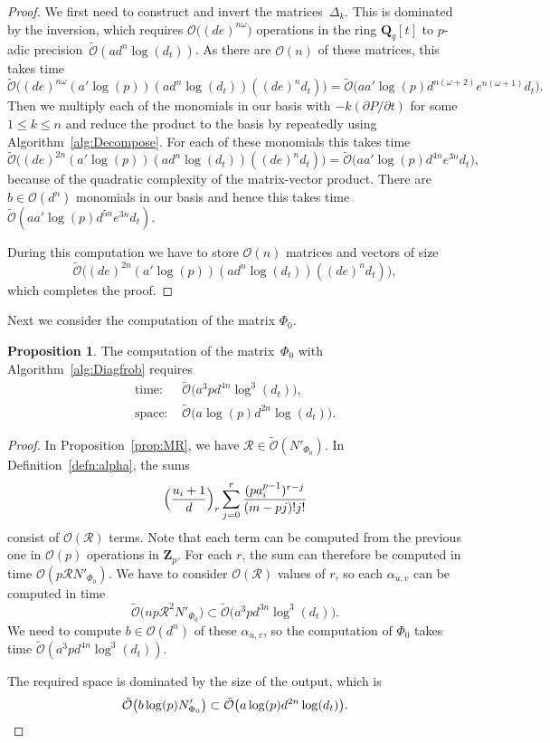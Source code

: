 \documentclass[a4paper,11pt]{article}
\numberwithin{equation}{section}
\newcommand{\ZZ}{\mathbf{Z}} %
\newcommand{\QQ}{\mathbf{Q}} %
\providecommand{\BigOh}{\mathcal{O}}          %
\providecommand{\SoftOh}{\tilde{\mathcal{O}}} %
\theoremstyle{definition}
\newtheorem{prop}[thm]{Proposition}
\begin{document}
\begin{proof}
We first need to construct and invert the matrices~$\Delta_k$.  This is 
dominated by the inversion, which requires $\BigOh\bigl((de)^{n \omega}\bigr)$ 
operations in the ring $\QQ_q[t]$ to $p$-adic 
precision~$\SoftOh(a d^n \log(d_t))$. As there are $\BigOh(n)$ of 
these matrices, this takes time 
\[
\SoftOh\bigl((de)^{n \omega} (a' \log(p)) (a d^n \log(d_t)) ((de)^n d_t)\bigr) = 
    \SoftOh\bigl(a a' \log(p) d^{n(\omega+2)} e^{n(\omega+1)} d_t\bigr).
\]
Then we multiply each of the monomials in our basis with 
$-k (\partial P / \partial t)$ for some $1 \leq k \leq n$ and 
reduce the product to the basis by repeatedly using 
Algorithm~\ref{alg:Decompose}.  For each of these monomials this 
takes time 
\[
\SoftOh\bigl((de)^{2n} (a' \log(p)) (a d^n \log(d_t)) ((de)^n d_t)\bigr) = 
    \SoftOh\bigl(a a' \log(p) d^{4n}e^{3n} d_t\bigr),
\]
because of the quadratic complexity of the matrix-vector product.  
There are $b \in \BigOh(d^n)$ monomials in our basis and hence this 
takes time $\SoftOh(a a' \log(p) d^{5n}e^{3n} d_t)$.

During this computation we have to store $\BigOh(n)$ matrices 
and vectors of size 
\[
\SoftOh\bigl((de)^{2n} (a' \log(p)) (a d^n \log(d_t)) ((de)^n d_t)\bigr),
\] 
which completes the proof.
\end{proof}

Next we consider the computation of the matrix $\Phi_0$.

\begin{prop} \label{prop:complexityPhi0}
The computation of the matrix~$\Phi_0$ with Algorithm~\ref{alg:Diagfrob} requires
\begin{align*}
\mbox{time: }  & \SoftOh\bigl(a^3 p d^{4n} \log^3(d_t)\bigr), \\
\mbox{space: } & \SoftOh\bigl(a \log(p) d^{2n} \log(d_t)\bigr).
\end{align*}
\end{prop}

\begin{proof}
In Proposition~\ref{prop:MR}, we have $\mathcal{R} \in \SoftOh(N'_{\Phi_0})$.
In Definition~\ref{defn:alpha}, the sums
\begin{equation*} \label{eqn:ifactor}
\Bigl(\frac{u_i+1}{d} \Bigr)_r \sum_{j=0}^{r} \frac{(p a_i^{p-1})^{r-j}}{(m-pj)!j!}
\end{equation*}
consist of $\BigOh(\mathcal{R})$ terms. Note that each term can be computed from the previous one in $\BigOh(p)$ operations 
in $\ZZ_p$. For each $r$, the sum can therefore be computed in time $\BigOh(p \mathcal{R} N'_{\Phi_0})$. We have to consider
$\BigOh(\mathcal{R})$ values of $r$, so each $\alpha_{u,v}$ can be computed in time 
\[
\SoftOh\bigl(np \mathcal{R}^2 N'_{\Phi_0}\bigr) \subset \SoftOh\bigl(a^3 p d^{3n} \log^3(d_t)\bigr).
\]
We need to compute $b \in \BigOh(d^n)$ of these $\alpha_{u,v}$, so the computation of $\Phi_0$
takes time $\SoftOh(a^3 p d^{4n} \log^3(d_t))$. 

The required space is dominated by the size of the output, which is
\[
\SoftOh\bigl(b \log(p) N'_{\Phi_0}\bigr) \subset \SoftOh\bigl(a \log(p) d^{2n} \log(d_t)\bigr). \qedhere
\]
\end{proof}
\end{document}
